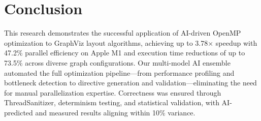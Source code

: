 \section{Conclusion}
\label{sec:conclusion}




This research demonstrates the successful application of AI-driven OpenMP optimization to GraphViz layout algorithms, achieving up to 3.78× speedup with 47.2\% parallel efficiency on Apple M1 and execution time reductions of up to 73.5\% across diverse graph configurations. Our multi-model AI ensemble automated the full optimization pipeline—from performance profiling and bottleneck detection to directive generation and validation—eliminating the need for manual parallelization expertise. Correctness was ensured through ThreadSanitizer, determinism testing, and statistical validation, with AI-predicted and measured results aligning within 10\% variance.


